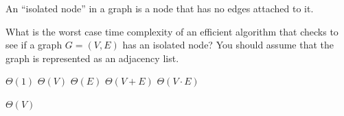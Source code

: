 \begin{prob}

    An ``isolated node'' in a graph is a node that has no edges attached to it.

    What is the worst case time complexity of an efficient algorithm that
    checks to see if a graph $G = (V, E)$ has an isolated node? You should
    assume that the graph is represented as an adjacency list.

    \begin{choices}
        \choice $\Theta(1)$
        \correctchoice $\Theta(V)$
        \choice $\Theta(E)$
        \choice $\Theta(V + E)$
        \choice $\Theta(V \cdot E)$
    \end{choices}

    \begin{soln}
        $\Theta(V)$
    \end{soln}

\end{prob}

